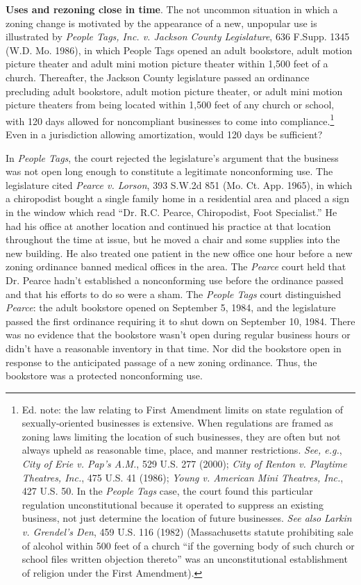 \item
\textbf{Uses and rezoning close in time}. The not uncommon situation in which a
zoning change is motivated by the appearance of a new, unpopular use is
illustrated by \textit{People Tags, Inc. v. Jackson County Legislature}, 636
F.Supp. 1345 (W.D. Mo. 1986), in which People Tags opened an adult bookstore,
adult motion picture theater and adult mini motion picture theater within 1,500
feet of a church. Thereafter, the Jackson County legislature passed an ordinance
precluding adult bookstore, adult motion picture theater, or adult mini motion
picture theaters from being located within 1,500 feet of any church or school,
with 120 days allowed for noncompliant businesses to come into
compliance.\footnote{Ed. note: the law relating to First Amendment limits on
state regulation of sexually-oriented businesses is extensive. When regulations
are framed as zoning laws limiting the location of such businesses, they are
often but not always upheld as reasonable time, place, and manner restrictions.
\textit{See, e.g.}, \emph{City of Erie v. Pap's A.M.}, 529 U.S. 277 (2000);
\emph{City of Renton v. Playtime Theatres, Inc.}, 475 U.S. 41 (1986);
\emph{Young v. American Mini Theatres, Inc.}, 427 U.S. 50. In the \textit{People
Tags} case, the court found this particular regulation unconstitutional because
it operated to suppress an existing business, not just determine the location of
future businesses. \textit{See also} \emph{Larkin v. Grendel's Den}, 459 U.S.
116 (1982) (Massachusetts statute prohibiting sale of alcohol within 500 feet of
a church ``if the governing body of such church or school files written
objection thereto'' was an unconstitutional establishment of religion under the
First Amendment).} Even in a jurisdiction allowing amortization, would 120 days
be sufficient? 

In \textit{People Tags}, the court rejected the legislature's argument that the
business was not open long enough to constitute a legitimate nonconforming use.
The legislature cited \emph{Pearce v. Lorson}, 393 S.W.2d 851 (Mo. Ct. App.
1965), in which a chiropodist bought a single family home in a residential area
and placed a sign in the window which read ``Dr. R.C. Pearce, Chiropodist, Foot
Specialist.'' He had his office at another location and continued his practice
at that location throughout the time at issue, but he moved a chair and some
supplies into the new building. He also treated one patient in the new office
one hour before a new zoning ordinance banned medical offices in the area. The
\textit{Pearce} court held that Dr. Pearce hadn't established a nonconforming
use before the ordinance passed and that his efforts to do so were a sham. The
\textit{People Tags} court distinguished \textit{Pearce}: the adult bookstore
opened on September 5, 1984, and the legislature passed the first ordinance
requiring it to shut down on September 10, 1984. There was no evidence that the
bookstore wasn't open during regular business hours or didn't have a reasonable
inventory in that time. Nor did the bookstore open in response to the
anticipated passage of a new zoning ordinance. Thus, the bookstore was a
protected nonconforming use.

